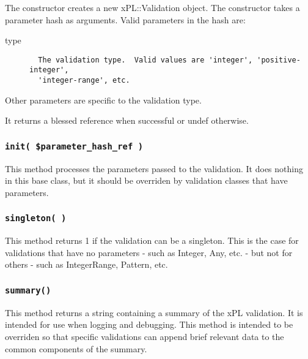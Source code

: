 \documentclass[12pt,a4paper]{article}
\begin{document}
The constructor creates a new xPL::Validation object.  The constructor
takes a parameter hash as arguments.  Valid parameters in the hash
are:

\begin{description}

\item[{type}] \mbox{}\begin{verbatim}
  The validation type.  Valid values are 'integer', 'positive-integer',
  'integer-range', etc.
\end{verbatim}
\end{description}


Other parameters are specific to the validation type.



It returns a blessed reference when successful or undef otherwise.

\subsubsection*{\texttt{init( \$parameter\_hash\_ref )}\label{xPL::Validation_init_parameter_hash_ref_}}


This method processes the parameters passed to the validation.  It
does nothing in this base class, but it should be overriden by
validation classes that have parameters.

\subsubsection*{\texttt{singleton( )}\label{xPL::Validation_singleton_}}


This method returns 1 if the validation can be a singleton.  This
is the case for validations that have no parameters - such as
Integer, Any, etc. - but not for others - such as IntegerRange,
Pattern, etc.

\subsubsection*{\texttt{summary()}\label{xPL::Validation_summary_}}


This method returns a string containing a summary of the xPL
validation.  It is intended for use when logging and debugging.  This
method is intended to be overriden so that specific validations can
append brief relevant data to the common components of the summary.
\end{document}
